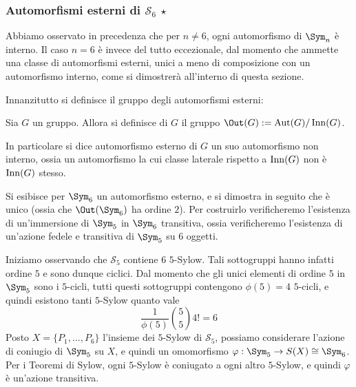 \documentclass[11pt]{scrartcl}
\begin{document}
	\subsubsection{Automorfismi esterni di \texorpdfstring{$\mathcal{S}_6$}{S₆} \texorpdfstring{$\star$}{★}}
	
	Abbiamo osservato in precedenza che per $n \neq 6$, ogni automorfismo di $\Sym_n$ è interno.
	Il caso $n = 6$ è invece del tutto eccezionale, dal momento che ammette una classe di automorfismi
	esterni, unici a meno di composizione con un automorfismo interno, come si dimostrerà all'interno
	di questa sezione. \medskip
	
	
	Innanzitutto si definisce il gruppo degli automorfismi esterni:

	\begin{definition}
		Sia $G$ un gruppo. Allora si definisce  di $G$
		il gruppo $\Out(G) := \Aut(G) / \Inn(G)$.
	\end{definition}
	
	In particolare si dice automorfismo esterno di $G$ un suo automorfismo non interno, ossia
	un automorfismo la cui classe laterale rispetto a $\operatorname{Inn}(G)$ non è $\operatorname{Inn}(G)$ stesso. \medskip
	

	Si esibisce per $\Sym_6$ un automorfismo esterno, e si dimostra in seguito che è unico
	(ossia che $\Out(\Sym_6)$ ha ordine $2$). Per costruirlo verificheremo l'esistenza di
	un'immersione di $\Sym_5$ in $\Sym_6$ transitiva, ossia verificheremo l'esistenza di
	un'azione fedele e transitiva di $\Sym_5$ su $6$ oggetti. \medskip
	

	Iniziamo osservando che $\mathcal{S}_5$ contiene $6$ $5$-Sylow. Tali sottogruppi hanno infatti
	ordine $5$ e sono dunque ciclici. Dal momento che gli unici elementi di ordine $5$ in
	$\Sym_5$ sono i $5$-cicli, tutti questi sottogruppi contengono $\phi(5) = 4$
	$5$-cicli, e quindi esistono tanti $5$-Sylow quanto vale
	\[ \frac{1}{\phi(5)} \binom{5}{5}4! = 6 \]
	Posto $X = \{P_1, \ldots, P_6\}$ l'insieme dei $5$-Sylow di $\mathcal{S}_5$, possiamo considerare
	l'azione di coniugio di $\Sym_5$ su $X$, e quindi un omomorfismo $\varphi : \Sym_5 \to S(X) \cong \Sym_6$.
	Per i Teoremi di Sylow, ogni $5$-Sylow è coniugato a ogni altro $5$-Sylow, e quindi $\varphi$ è
	un'azione transitiva. \medskip
	
\end{document}
